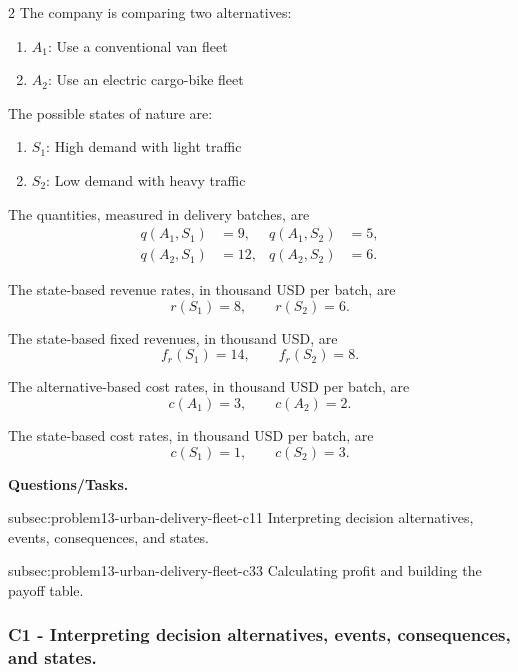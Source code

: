 \begin{multicols}{2}
	The company is comparing two alternatives:
	\begin{enumerate}[label=\arabic*.]
		\item \(A_1\): Use a conventional van fleet
		\item \(A_2\): Use an electric cargo-bike fleet
	\end{enumerate}
	
	The possible states of nature are:
	\begin{enumerate}[label=\arabic*.]
		\item \(S_1\): High demand with light traffic
		\item \(S_2\): Low demand with heavy traffic
	\end{enumerate}
	
	\columnbreak
	
	The quantities, measured in delivery batches, are
	\[
	\begin{aligned}
		q(A_1,S_1)&=9,
		&
		q(A_1,S_2)&=5,
		\\
		q(A_2,S_1)&=12,
		&
		q(A_2,S_2)&=6.
	\end{aligned}
	\]
	
	The state-based revenue rates, in thousand USD per batch, are
	\[
	r(S_1)=8,
	\qquad
	r(S_2)=6.
	\]
	
	The state-based fixed revenues, in thousand USD, are
	\[
	f_r(S_1)=14,
	\qquad
	f_r(S_2)=8.
	\]
	
	The alternative-based cost rates, in thousand USD per batch, are
	\[
	c(A_1)=3,
	\qquad
	c(A_2)=2.
	\]
	
	The state-based cost rates, in thousand USD per batch, are
	\[
	c(S_1)=1,
	\qquad
	c(S_2)=3.
	\]
\end{multicols}

\textbf{Questions/Tasks.}
\begin{enumerate}
	\CriterionTask
	{subsec:problem13-urban-delivery-fleet-c1}{1}
	{Interpreting decision alternatives, events, consequences, and states.}

	\CriterionTask
	{subsec:problem13-urban-delivery-fleet-c3}{3}
	{Calculating profit and building the payoff table.}
\end{enumerate}

\subsubsection*{C1 - Interpreting decision alternatives, events, consequences, and states.}
\label{subsec:problem13-urban-delivery-fleet-c1}

